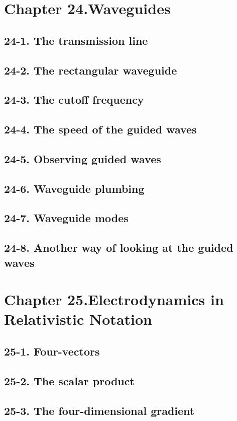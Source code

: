 \documentclass{article}
\begin{document}
\section{Chapter 24.Waveguides}
\subsection{24-1. The transmission line}
\subsection{24-2. The rectangular waveguide}
\subsection{24-3. The cutoff frequency}
\subsection{24-4. The speed of the guided waves}
\subsection{24-5. Observing guided waves}
\subsection{24-6. Waveguide plumbing}
\subsection{24-7. Waveguide modes}
\subsection{24-8. Another way of looking at the guided waves}
\section{Chapter 25.Electrodynamics in Relativistic Notation}
\subsection{25-1. Four-vectors}
\subsection{25-2. The scalar product}
\subsection{25-3. The four-dimensional gradient}
\end{document}
